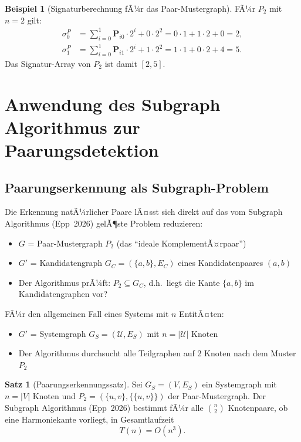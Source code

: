 ﻿\documentclass[a4paper,12pt]{article}
\theoremstyle{definition}
\newtheorem{beispiel}{Beispiel}
\newtheorem{satz}{Satz}
\begin{document}
\begin{beispiel}[Signaturberechnung fÃ¼r das Paar-Mustergraph]
	FÃ¼r $P_2$ mit $n=2$ gilt:
	\begin{align*}
		\sigma_0^P &= \sum_{i=0}^{1} \mathbf{P}_{i0} \cdot 2^i + 0 \cdot 2^2
		           = 0 \cdot 1 + 1 \cdot 2 + 0 = 2,\\
		\sigma_1^P &= \sum_{i=0}^{1} \mathbf{P}_{i1} \cdot 2^i + 1 \cdot 2^2
		           = 1 \cdot 1 + 0 \cdot 2 + 4 = 5.
	\end{align*}
	Das Signatur-Array von $P_2$ ist damit $[2, 5]$.
\end{beispiel}

\section{Anwendung des Subgraph Algorithmus zur Paarungsdetektion}
\label{sec:subgraph}

\subsection{Paarungserkennung als Subgraph-Problem}

Die Erkennung natÃ¼rlicher Paare lÃ¤sst sich direkt auf das vom Subgraph Algorithmus
(Epp~2026) gelÃ¶ste Problem reduzieren:

\begin{itemize}
	\item $G$ = Paar-Mustergraph $P_2$ (das \enquote{ideale KomplementÃ¤rpaar})
	\item $G'$ = Kandidatengraph $G_C = (\{a, b\}, E_C)$ eines Kandidatenpaares $(a,b)$
	\item Der Algorithmus prÃ¼ft: $P_2 \subseteq G_C$, d.h.\ liegt die Kante
	$\{a,b\}$ im Kandidatengraphen vor?
\end{itemize}

FÃ¼r den allgemeinen Fall eines Systems mit $n$ EntitÃ¤ten:

\begin{itemize}
	\item $G'$ = Systemgraph $G_S = (\mathcal{U}, E_S)$ mit $n = |\mathcal{U}|$ Knoten
	\item Der Algorithmus durchsucht alle Teilgraphen auf 2 Knoten nach dem Muster $P_2$
\end{itemize}

\begin{satz}[Paarungserkennungssatz]
	\label{satz:erkennung}
	Sei $G_S = (V, E_S)$ ein Systemgraph mit $n = |V|$ Knoten und
	$P_2 = (\{u,v\}, \{\{u,v\}\})$ der Paar-Mustergraph. Der Subgraph Algorithmus
	(Epp~2026) bestimmt fÃ¼r alle $\binom{n}{2}$ Knotenpaare, ob eine Harmoniekante
	vorliegt, in Gesamtlaufzeit
	\[
		T(n) = O(n^3).
	\]
\end{satz}
\end{document}
